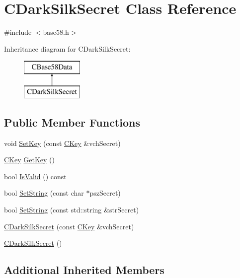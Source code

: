\hypertarget{class_c_dark_silk_secret}{}\section{C\+Dark\+Silk\+Secret Class Reference}
\label{class_c_dark_silk_secret}


{\ttfamily \#include $<$base58.\+h$>$}

Inheritance diagram for C\+Dark\+Silk\+Secret\+:\begin{figure}[H]
\begin{center}
\leavevmode
\includegraphics[height=2.000000cm]{class_c_dark_silk_secret}
\end{center}
\end{figure}
\subsection*{Public Member Functions}
\begin{DoxyCompactItemize}
\item 
void \hyperlink{class_c_dark_silk_secret_a74deecf3a37ff76ff64ca8b935045bbd}{Set\+Key} (const \hyperlink{class_c_key}{C\+Key} \&vch\+Secret)
\item 
\hyperlink{class_c_key}{C\+Key} \hyperlink{class_c_dark_silk_secret_af7b026d90efb897f6e592ce424c8d2c9}{Get\+Key} ()
\item 
bool \hyperlink{class_c_dark_silk_secret_a30db2efc9987de8a743a2aa000c84617}{Is\+Valid} () const 
\item 
bool \hyperlink{class_c_dark_silk_secret_a06075192fb631c3b406a6ca231d2f926}{Set\+String} (const char $\ast$psz\+Secret)
\item 
bool \hyperlink{class_c_dark_silk_secret_aa6c0a6081ce24721d919c7d606b880e3}{Set\+String} (const std\+::string \&str\+Secret)
\item 
\hyperlink{class_c_dark_silk_secret_af2fbf0da9f230b9c00fbf5d8770af795}{C\+Dark\+Silk\+Secret} (const \hyperlink{class_c_key}{C\+Key} \&vch\+Secret)
\item 
\hyperlink{class_c_dark_silk_secret_abbc53998331cd66391782e00743eb88c}{C\+Dark\+Silk\+Secret} ()
\end{DoxyCompactItemize}
\subsection*{Additional Inherited Members}


